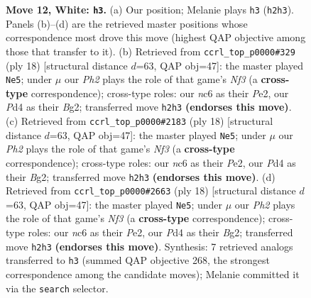\documentclass[11pt]{article}
\begin{document}
\begin{figure}[p]
\caption{\textbf{Move 12, White: \texttt{h3}.} (a) Our position; Melanie plays \texttt{h3} (\texttt{h2h3}). Panels (b)--(d) are the retrieved master positions whose correspondence most drove this move (highest QAP objective among those that transfer to it). (b) Retrieved from \texttt{ccrl\_top\_p0000\#329} (ply 18) [structural distance $d$=63, QAP obj=47]: the master played \texttt{Ne5}; under $\mu$ our \emph{Ph2} plays the role of that game's \emph{Nf3} (a \textbf{cross-type} correspondence); cross-type roles: our \emph{n}c6 as their \emph{P}e2, our \emph{P}d4 as their \emph{B}g2; transferred move \texttt{h2h3} \textbf{(endorses this move)}. (c) Retrieved from \texttt{ccrl\_top\_p0000\#2183} (ply 18) [structural distance $d$=63, QAP obj=47]: the master played \texttt{Ne5}; under $\mu$ our \emph{Ph2} plays the role of that game's \emph{Nf3} (a \textbf{cross-type} correspondence); cross-type roles: our \emph{n}c6 as their \emph{P}e2, our \emph{P}d4 as their \emph{B}g2; transferred move \texttt{h2h3} \textbf{(endorses this move)}. (d) Retrieved from \texttt{ccrl\_top\_p0000\#2663} (ply 18) [structural distance $d$=63, QAP obj=47]: the master played \texttt{Ne5}; under $\mu$ our \emph{Ph2} plays the role of that game's \emph{Nf3} (a \textbf{cross-type} correspondence); cross-type roles: our \emph{n}c6 as their \emph{P}e2, our \emph{P}d4 as their \emph{B}g2; transferred move \texttt{h2h3} \textbf{(endorses this move)}. Synthesis: 7 retrieved analogs transferred to \texttt{h3} (summed QAP objective 268, the strongest correspondence among the candidate moves); Melanie committed it via the \texttt{search} selector.}
\label{fig:thought-m22}
\end{figure}

\clearpage
\end{document}
